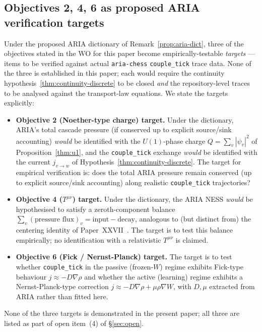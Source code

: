 \documentclass[11pt]{article}
\theoremstyle{definition}
\begin{document}
\subsection{Objectives 2, 4, 6 as proposed ARIA verification targets}

Under the proposed ARIA dictionary of Remark~\ref{prop:aria-dict}, three of the objectives stated in the WO for this paper become empirically-testable \emph{targets} --- items to be verified against actual \texttt{aria-chess} \texttt{couple\_tick} trace data. None of the three is established in this paper; each would require the continuity hypothesis~\ref{thm:continuity-discrete} to be closed \emph{and} the repository-level traces to be analysed against the transport-law equations. We state the targets explicitly:

\begin{itemize}
    \item \textbf{Objective 2 (Noether-type charge) target.} Under the dictionary, ARIA's total cascade pressure (if conserved up to explicit source/sink accounting) \emph{would} be identified with the $U(1)$-phase charge $Q = \sum_v |\psi_v|^2$ of Proposition~\ref{thm:u1}, and the \texttt{couple\_tick} exchange \emph{would} be identified with the current $j_{v \to w}$ of Hypothesis~\ref{thm:continuity-discrete}. The target for empirical verification is: does the total ARIA pressure remain conserved (up to explicit source/sink accounting) along realistic \texttt{couple\_tick} trajectories?
    \item \textbf{Objective 4 ($T^{\mu\nu}$) target.} Under the dictionary, the ARIA NESS \emph{would} be hypothesised to satisfy a zeroth-component balance $\sum_v (\text{pressure flux})_v = \text{input} - \text{decay}$, analogous to (but distinct from) the centering identity of Paper~XXVII~\citep{SmartXXVII}. The target is to test this balance empirically; no identification with a relativistic $T^{\mu\nu}$ is claimed.
    \item \textbf{Objective 6 (Fick / Nernst-Planck) target.} The target is to test whether \texttt{couple\_tick} in the passive (frozen-$W$) regime exhibits Fick-type behaviour $j \approx -D \nabla\rho$ and whether the active (learning) regime exhibits a Nernst-Planck-type correction $j \approx -D \nabla\rho + \mu \rho \nabla W$, with $D, \mu$ extracted from ARIA rather than fitted here.
\end{itemize}

None of the three targets is demonstrated in the present paper; all three are listed as part of open item~(4) of \S\ref{sec:open}.
\end{document}
